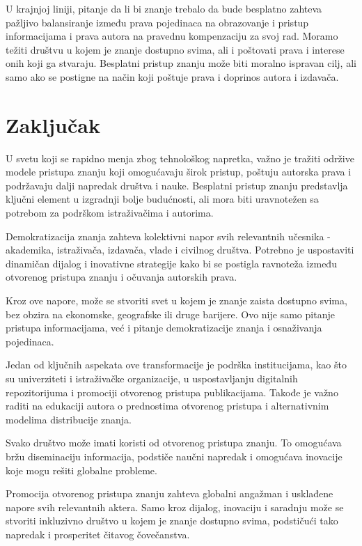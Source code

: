\documentclass{article}
\begin{document}
U krajnjoj liniji, pitanje da li bi znanje trebalo da bude besplatno zahteva pažljivo balansiranje između prava pojedinaca na obrazovanje i pristup informacijama i prava autora na pravednu kompenzaciju za svoj rad. Moramo težiti društvu u kojem je znanje dostupno svima, ali i poštovati prava i interese onih koji ga stvaraju. Besplatni pristup znanju može biti moralno ispravan cilj, ali samo ako se postigne na način koji poštuje prava i doprinos autora i izdavača.


\section{Zaključak}

U svetu koji se rapidno menja zbog tehnološkog napretka, važno je tražiti održive modele pristupa znanju koji omogućavaju širok pristup, poštuju autorska prava i podržavaju dalji napredak društva i nauke. Besplatni pristup znanju predstavlja ključni element u izgradnji bolje budućnosti, ali mora biti uravnotežen sa potrebom za podrškom istraživačima i autorima.

Demokratizacija znanja zahteva kolektivni napor svih relevantnih učesnika - akademika, istraživača, izdavača, vlade i civilnog društva. Potrebno je uspostaviti dinamičan dijalog i inovativne strategije kako bi se postigla ravnoteža između otvorenog pristupa znanju i očuvanja autorskih prava. 

Kroz ove napore, može se stvoriti svet u kojem je znanje zaista dostupno svima, bez obzira na ekonomske, geografske ili druge barijere. Ovo nije samo pitanje pristupa informacijama, već i pitanje demokratizacije znanja i osnaživanja pojedinaca. 

Jedan od ključnih aspekata ove transformacije je podrška institucijama, kao što su univerziteti i istraživačke organizacije, u uspostavljanju digitalnih repozitorijuma i promociji otvorenog pristupa publikacijama. Takođe je važno raditi na edukaciji autora o prednostima otvorenog pristupa i alternativnim modelima distribucije znanja.

Svako društvo može imati koristi od otvorenog pristupa znanju. To omogućava bržu diseminaciju informacija, podstiče naučni napredak i omogućava inovacije koje mogu rešiti globalne probleme. 

Promocija otvorenog pristupa znanju zahteva globalni angažman i usklađene napore svih relevantnih aktera. Samo kroz dijalog, inovaciju i saradnju može se stvoriti inkluzivno društvo u kojem je znanje dostupno svima, podstičući tako napredak i prosperitet čitavog čovečanstva.
\end{document}
